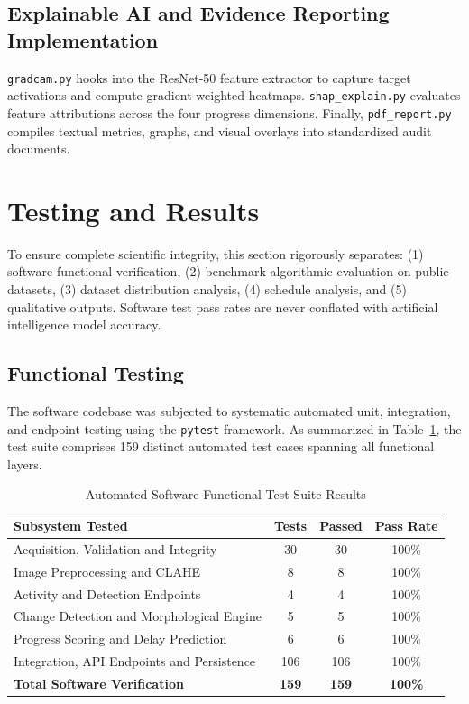 \documentclass[conference]{IEEEtran}
\begin{document}
\subsection{Explainable AI and Evidence Reporting Implementation}
\texttt{gradcam.py} hooks into the ResNet-50 feature extractor to capture target activations and compute gradient-weighted heatmaps. \texttt{shap\_explain.py} evaluates feature attributions across the four progress dimensions. Finally, \texttt{pdf\_report.py} compiles textual metrics, graphs, and visual overlays into standardized audit documents.

\section{Testing and Results}

To ensure complete scientific integrity, this section rigorously separates: (1) software functional verification, (2) benchmark algorithmic evaluation on public datasets, (3) dataset distribution analysis, (4) schedule analysis, and (5) qualitative outputs. Software test pass rates are never conflated with artificial intelligence model accuracy.

\subsection{Functional Testing}
The software codebase was subjected to systematic automated unit, integration, and endpoint testing using the \texttt{pytest} framework. As summarized in Table~\ref{tab:test_results}, the test suite comprises 159 distinct automated test cases spanning all functional layers.

\begin{table}[htbp]
    \caption{Automated Software Functional Test Suite Results}
    \label{tab:test_results}
    \centering
    \begin{tabular}{lccc}
        \toprule
        \textbf{Subsystem Tested} & \textbf{Tests} & \textbf{Passed} & \textbf{Pass Rate} \\
        \midrule
        Acquisition, Validation and Integrity & 30 & 30 & 100\% \\
        Image Preprocessing and CLAHE & 8 & 8 & 100\% \\
        Activity and Detection Endpoints & 4 & 4 & 100\% \\
        Change Detection and Morphological Engine & 5 & 5 & 100\% \\
        Progress Scoring and Delay Prediction & 6 & 6 & 100\% \\
        Integration, API Endpoints and Persistence & 106 & 106 & 100\% \\
        \midrule
        \textbf{Total Software Verification} & \textbf{159} & \textbf{159} & \textbf{100\%} \\
        \bottomrule
    \end{tabular}
\end{table}
\end{document}
